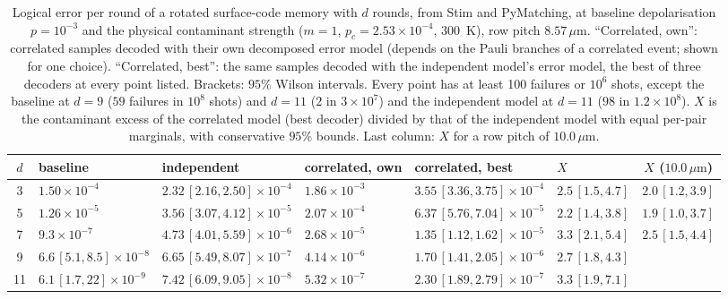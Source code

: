 \documentclass[aps,pra,twocolumn,superscriptaddress,longbibliography,floatfix]{revtex4-2}
\newcommand{\um}{\,\mu\mathrm{m}}
\begin{document}
\begin{table}[!tp]
\caption{Logical error per round of a rotated surface-code memory with $d$ rounds, from Stim and PyMatching, at baseline depolarisation $p=10^{-3}$ and the physical contaminant strength ($m=1$, $p_c=2.53\times10^{-4}$, $300$~K), row pitch $8.57\um$. ``Correlated, own'': correlated samples decoded with their own decomposed error model (depends on the Pauli branches of a correlated event; shown for one choice). ``Correlated, best'': the same samples decoded with the independent model's error model, the best of three decoders at every point listed. Brackets: $95\%$ Wilson intervals. Every point has at least 100 failures or $10^6$ shots, except the baseline at $d=9$ ($59$ failures in $10^8$ shots) and $d=11$ ($2$ in $3\times10^{7}$) and the independent model at $d=11$ ($98$ in $1.2\times10^{8}$). $X$ is the contaminant excess of the correlated model (best decoder) divided by that of the independent model with equal per-pair marginals, with conservative $95\%$ bounds. Last column: $X$ for a row pitch of $10.0\um$.}
\label{tab:logical}
\begin{ruledtabular}
\begin{tabular}{clllllc}
$d$ & baseline & independent & correlated, own & correlated, best & $X$ & $X$ ($10.0\um$)\\ \hline
3 & $1.50\times10^{-4}$ & $2.32\,[2.16,2.50]\times10^{-4}$ & $1.86\times10^{-3}$ & $3.55\,[3.36,3.75]\times10^{-4}$ & $2.5\,[1.5,4.7]$ & $2.0\,[1.2,3.9]$\\
5 & $1.26\times10^{-5}$ & $3.56\,[3.07,4.12]\times10^{-5}$ & $2.07\times10^{-4}$ & $6.37\,[5.76,7.04]\times10^{-5}$ & $2.2\,[1.4,3.8]$ & $1.9\,[1.0,3.7]$\\
7 & $9.3\times10^{-7}$ & $4.73\,[4.01,5.59]\times10^{-6}$ & $2.68\times10^{-5}$ & $1.35\,[1.12,1.62]\times10^{-5}$ & $3.3\,[2.1,5.4]$ & $2.5\,[1.5,4.4]$\\
9 & $6.6\,[5.1,8.5]\times10^{-8}$ & $6.65\,[5.49,8.07]\times10^{-7}$ & $4.14\times10^{-6}$ & $1.70\,[1.41,2.05]\times10^{-6}$ & $2.7\,[1.8,4.3]$ & \\
11 & $6.1\,[1.7,22]\times10^{-9}$ & $7.42\,[6.09,9.05]\times10^{-8}$ & $5.32\times10^{-7}$ & $2.30\,[1.89,2.79]\times10^{-7}$ & $3.3\,[1.9,7.1]$ & \\
\end{tabular}
\end{ruledtabular}
\end{table}

\end{document}
